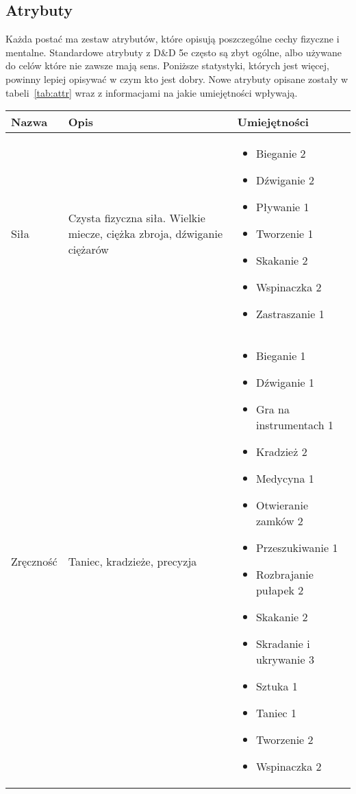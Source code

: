 \subsection{Atrybuty}
\label{ssec:attribs}

Każda postać ma zestaw atrybutów, które opisują poszczególne cechy fizyczne i
mentalne. Standardowe atrybuty z D\&D 5e często są zbyt ogólne, albo używane do
celów które nie zawsze mają sens. Poniższe statystyki, których jest więcej,
powinny lepiej opisywać w czym kto jest dobry.  Nowe atrybuty opisane zostały w
tabeli~\ref{tab:attr} wraz z informacjami na jakie umiejętności wpływają.

\begin{longtable}[c]{m{}m{}m{}}
	\toprule

	Nazwa        & Opis & Umiejętności \\* \midrule
	\endhead
	\endfoot
	\endlastfoot
	Siła &
	Czysta fizyczna siła. Wielkie miecze, ciężka zbroja, dźwiganie ciężarów &
	\begin{itemize}
		\item Bieganie 2
		\item Dźwiganie 2
		\item Pływanie 1
		\item Tworzenie 1
		\item Skakanie 2
		\item Wspinaczka 2
		\item Zastraszanie 1
	\end{itemize} \\ \midrule
	Zręczność &
	Taniec, kradzieże, precyzja &
	\begin{itemize}
		\item Bieganie 1
		\item Dźwiganie 1
		\item Gra na instrumentach 1
		\item Kradzież 2
		\item Medycyna 1
		\item Otwieranie zamków 2
		\item Przeszukiwanie 1
		\item Rozbrajanie pułapek 2
		\item Skakanie 2
		\item Skradanie i ukrywanie 3
		\item Sztuka 1
		\item Taniec 1
		\item Tworzenie 2
		\item Wspinaczka 2

\end{itemize}
\end{longtable}
